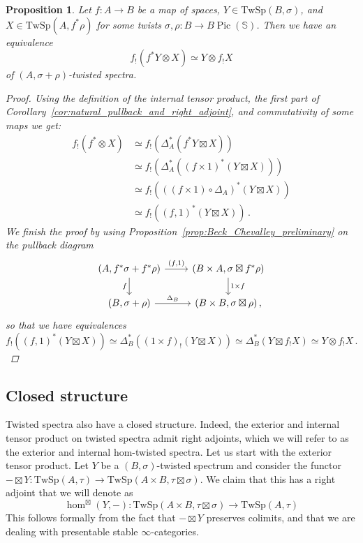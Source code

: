 \documentclass[10pt]{amsart}
\newcommand{\longto}{\longrightarrow}
\theoremstyle{plain}
\newtheorem{proposition}[theorem]{Proposition}
\theoremstyle{definition}
\DeclareMathOperator{\Pic}{Pic}
\newcommand{\bS}{\mathbb{S}}
\newcommand{\TwSp}{\mathrm{TwSp}}
\begin{document}
\begin{proposition} \label{prop:proj_iso_prelim}
  Let $f : A \to B$ be a map of spaces, $Y \in \TwSp(B,\sigma)$, and $X \in \TwSp(A,f^* \rho)$ for some twists $\sigma , \rho : B \to B \Pic(\bS)$. Then we have an equivalence
  \[
  f_!(f^* Y \otimes X) \simeq Y \otimes f_! X
  \]
  of $(A,\sigma + \rho)$-twisted spectra.
  \begin{proof}
    Using the definition of the internal tensor product, the first part of Corollary~\ref{cor:natural_pullback_and_right_adjoint}, and commutativity of some maps we get:
    \begin{align*}
      f_!(f^* \otimes X) &\simeq f_! (\Delta_A^*(f^* Y \boxtimes X)) \\
      &\simeq f_!(\Delta_A^*((f \times 1)^*(Y \boxtimes X))) \\
      &\simeq f_!( ((f \times 1) \circ \Delta_A)^*(Y \boxtimes X)) \\
      &\simeq f_!((f,1)^*(Y \boxtimes X)) \,.
    \end{align*}
    We finish the proof by using Proposition~\ref{prop:Beck_Chevalley_preliminary} on the pullback diagram
    \[
    \begin{tikzcd}
      (A,f^* \sigma + f^* \rho) \arrow[d,"f"'] \arrow[r,"{(f,1)}"] & (B \times A,\sigma \boxtimes f^* \rho) \arrow[d,"1 \times f"] \\
      (B,\sigma + \rho) \arrow[r,"\Delta_B"] & (B \times B, \sigma \boxtimes \rho) \,,
    \end{tikzcd}
    \]
    so that we have equivalences
    \[
    f_!((f,1)^*(Y \boxtimes X)) \simeq \Delta_B^*((1 \times f)_!(Y \boxtimes X)) \simeq \Delta_B^*(Y \boxtimes f_! X) \simeq Y \otimes f_! X \,.
    \]
  \end{proof}
\end{proposition}


\subsection{Closed structure} \label{sec:closed_individualtwists}

Twisted spectra also have a closed structure.
Indeed, the exterior and internal tensor product on twisted spectra admit right adjoints, which we will refer to as the exterior and internal hom-twisted spectra.
Let us start with the exterior tensor product.
Let $Y$ be a $(B,\sigma)$-twisted spectrum and consider the functor $- \boxtimes Y : \TwSp(A,\tau) \to \TwSp(A \times B, \tau \boxtimes \sigma)$. We claim that this has a right adjoint that we will denote as
\[
\hom^{\boxtimes}(Y,-) : \TwSp(A \times B , \tau \boxtimes \sigma) \longto \TwSp(A,\tau)
\]
This follows formally from the fact that $- \boxtimes Y$ preserves colimits, and that we are dealing with presentable stable $\infty$-categories.
\end{document}

